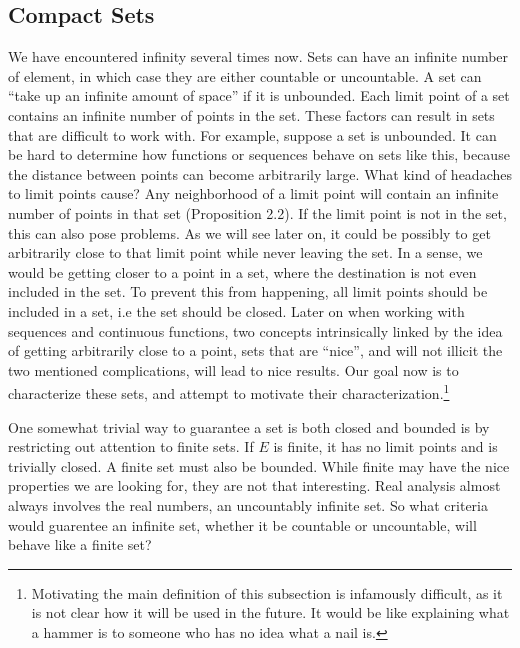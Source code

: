 \documentclass{article}
\theoremstyle{definition}
\begin{document}
	\subsection{Compact Sets}
	We have encountered infinity several times now. Sets can have an infinite number of element, in which case they are either countable or uncountable. A set can ``take up an infinite amount of space'' if it is unbounded. Each limit point of a set contains an infinite number of points in the set. These factors can result in sets that are difficult to work with. For example, suppose a set is unbounded. It can be hard to determine how functions or sequences behave on sets like this, because the distance between points can become arbitrarily large. What kind of headaches to limit points cause? Any neighborhood of a limit point will contain an infinite number of points in that set (Proposition 2.2). If the limit point is not in the set, this can also pose problems. As we will see later on, it could be possibly to get arbitrarily close to that limit point while never leaving the set. In a sense, we would be getting closer to a point in a set, where the destination is not even included in the set. To prevent this from happening, all limit points should be included in a set, i.e the set should be closed. Later on when working with sequences and continuous functions, two concepts intrinsically linked by the idea of getting arbitrarily close to a point, sets that are ``nice'', and will not illicit the two mentioned complications, will lead to nice results. Our goal now is to characterize these sets, and attempt to motivate their characterization.\footnote{Motivating the main definition of this subsection is infamously difficult, as it is not clear how it will be used in the future. It would be like explaining what a hammer is to someone who has no idea what a nail is. }   
	
	One somewhat trivial way to guarantee a set is both closed and bounded is by restricting out attention to finite sets. If $ E $ is finite, it has no limit points and is trivially closed. A finite set must also be bounded. While finite may have the nice properties we are looking for, they are not that interesting. Real analysis almost always involves the real numbers, an uncountably infinite set. So what criteria would guarentee an infinite set, whether it be countable or uncountable, will behave like a finite set?
	
\end{document}
